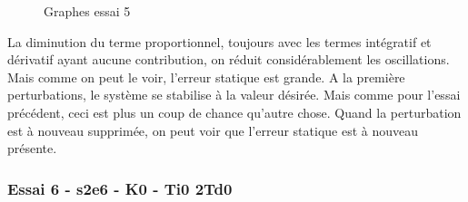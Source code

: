 \begin{figure}[H]
    \centering
    \caption{Graphes essai 5}
    \label{fig:essai-5}
\end{figure}

La diminution du terme proportionnel, toujours avec les termes intégratif et dérivatif
ayant aucune contribution, on réduit considérablement les oscillations. Mais
comme on peut le voir, l'erreur statique est grande. A la première perturbations,
le système se stabilise à la valeur désirée. Mais comme pour l'essai précédent,
ceci est plus un coup de chance qu'autre chose. Quand la perturbation est à nouveau
supprimée, on peut voir que l'erreur statique est à nouveau présente.


\subsubsection{Essai 6 - s2e6 - K0 - Ti0 2Td0}

